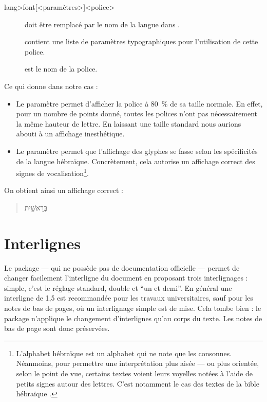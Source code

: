 \begin{latexcode}
\newfontfamily\<lang>font[<paramètres>]{<police>}
\end{latexcode}

\begin{description}
\item[]doit être remplacé par le nom de la langue dans .
\item[]contient une liste de paramètres typographiques pour l'utilisation de cette police.
\item[]est le nom de la police.
\end{description}

Ce qui donne dans notre cas :
\begin{latexcode}
\newfontfamily{}
\end{latexcode}

\begin{itemize}
\item Le paramètre  permet d'afficher la police à 80~\% de sa taille normale. En effet, pour un nombre de points donné, toutes les polices n'ont pas nécessairement la même hauteur de lettre. En  laissant une taille standard nous aurions abouti à un affichage inesthétique.
\item Le paramètre  permet que l'affichage des glyphes se fasse selon les spécificités de la langue hébraïque. Concrètement, cela autorise un affichage correct des signes de vocalisation\footnote{L'alphabet hébraïque est un alphabet qui ne note que les consonnes. Néanmoins, pour permettre une interprétation plus aisée --- ou plus orientée, selon le point de vue, certains textes voient leurs voyelles notées à l'aide de petits signes autour des lettres. C'est notamment le cas des textes de la bible hébraïque \parencite[Voir][4-7]{Verheij2007}.}.
\end{itemize}

On obtient ainsi un affichage correct :
\begin{quotation}
\texthebrew{בְּרֵאשִׁ֖ית}
\end{quotation}
\section{Interlignes}\label{interligne}

Le package  --- qui ne possède pas de documentation officielle --- permet de changer facilement l'interligne du document en proposant trois interlignages : simple, c'est le réglage standard, double et \enquote{un et demi}. En général une interligne de 1,5 est recommandée pour les travaux universitaires, sauf pour les notes de bas de pages, où un interlignage simple est de mise. Cela tombe bien : le package n'applique le changement d'interlignes qu'au corps du texte. Les notes de bas de page sont donc préservées.

